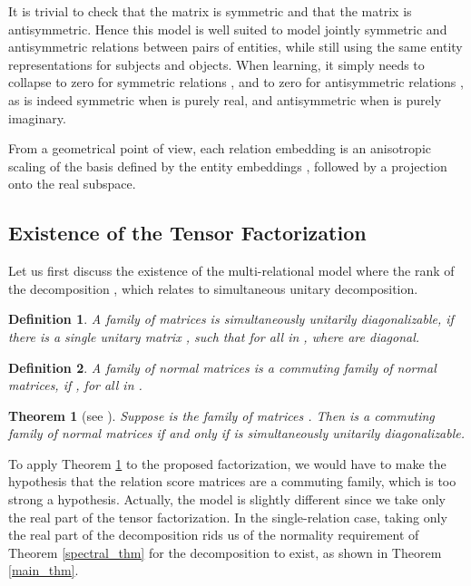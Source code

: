\documentclass[twoside,11pt]{article}
\newtheorem{thm}{Theorem}
\newtheorem{defn}{Definition}
\begin{document}
It is trivial to check that the matrix  is symmetric and that the matrix  is antisymmetric.
Hence this model is well suited to model jointly symmetric and antisymmetric relations between pairs of entities, while still using the same entity representations for subjects and objects.
When learning, it simply needs to 
collapse  to zero for symmetric relations , and 
to zero for antisymmetric relations ,
as 
is indeed symmetric when  is purely real, 
and antisymmetric when  is purely imaginary.

From a geometrical point of view, 
each relation embedding  is an anisotropic
scaling of the basis defined by the entity embeddings , 
followed by a projection onto the real subspace.

\subsection{Existence of the Tensor Factorization}

Let us first discuss the existence of the multi-relational
model where the rank of the decomposition ,
which relates to simultaneous unitary decomposition.

\begin{defn}
    A family of matrices  is simultaneously unitarily diagonalizable,
    if there is a single unitary matrix , such that   for all  in , where  are diagonal.
\end{defn}

\begin{defn}
    A family of normal matrices 
    is a commuting family of normal matrices, if 
    , for all  in .
\end{defn}


\begin{thm}[see \citet{horn2012matrix}]
    \label{thm:commuting}
    Suppose  is  the family of matrices   .
    Then  is a commuting family of normal matrices if and only if
     is simultaneously unitarily diagonalizable.
\end{thm}

To apply Theorem \ref{thm:commuting} to the proposed factorization, 
we would have to make the hypothesis
that the relation score matrices  are a commuting family, which is too strong
a hypothesis. Actually, the model is slightly different since we take only the real part
of the tensor factorization. In the single-relation case, taking only
the real part of the decomposition rids us of the normality requirement 
of Theorem \ref{spectral_thm} for the decomposition to exist, as shown in Theorem \ref{main_thm}.
\end{document}
